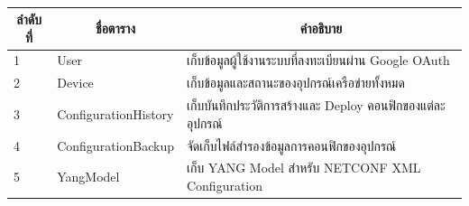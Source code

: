 \begin{table}[H]
    \caption{}
    \label{tab:database_tables}
    \fontSixTeen 
    \begin{tabularx}{\textwidth}{|l|l|X|} 
        \hline
        \multicolumn{1}{|c|}{\textbf{ลำดับที่}} & \multicolumn{1}{c|}{\textbf{ชื่อตาราง}} & \multicolumn{1}{c|}{\textbf{คำอธิบาย}} \\
        \hline
        1 & User & เก็บข้อมูลผู้ใช้งานระบบที่ลงทะเบียนผ่าน Google OAuth \\
        \hline
        2 & Device & เก็บข้อมูลและสถานะของอุปกรณ์เครือข่ายทั้งหมด \\
        \hline
        3 & ConfigurationHistory & เก็บบันทึกประวัติการสร้างและ Deploy คอนฟิกของแต่ละอุปกรณ์ \\
        \hline
        4 & ConfigurationBackup & จัดเก็บไฟล์สำรองข้อมูลการคอนฟิกของอุปกรณ์ \\
        \hline
        5 & YangModel & เก็บ YANG Model สำหรับ NETCONF XML Configuration \\
        \hline
    \end{tabularx}
\end{table}


